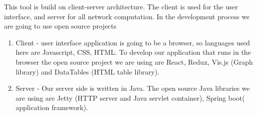 \documentclass{article}
\begin{document}
    This tool is build on client-server architecture. The client is used for the user interface, and server for all network computation. In the development process we are going to use open source projects

    \begin{enumerate}
        \item Client - user interface application is going to be a browser, so languages used here are Javascript, CSS, HTML. To develop our application that runs in the browser the open source project we are using are React, Redux, Vis.js (Graph library) and DataTables (HTML table library).
        \item Server - Our server side is written in Java. The open source Java libraries we are using are Jetty (HTTP server and Java servlet container), Spring boot( application framework).
    \end{enumerate}
\end{document}
